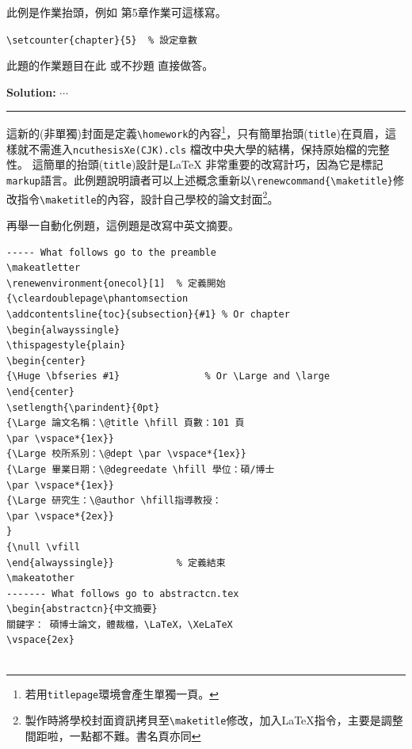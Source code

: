 \begin{appendB}
此例是作業抬頭，例如 第5章作業可這樣寫。

\verb|\setcounter{chapter}{5}  % 設定章數|
\setcounter{chapter}{5}
\begin{pr}
此題的作業題目在此 或不抄題 直接做答。

{\bf Solution:}
$\cdots$
\end{pr}

\rule{\linewidth}{0.5mm} 

這新的(非單獨)封面是定義\verb|\homework|的內容\footnote{若用{\tt titlepage}環境會產生單獨一頁。}，只有簡單抬頭({\tt title})在頁眉，這樣就不需進入{\tt ncuthesisXe(CJK).cls}
檔改中央大學的結構，保持原始檔的完整性。
這簡單的抬頭({\tt title})設計是\LaTeX{} 非常重要的改寫計巧，因為它是標記{\tt markup}語言。此例題說明讀者可以上述概念重新以\verb|\renewcommand{\maketitle}|修改指令\verb|\maketitle|的內容，設計自己學校的論文封面\footnote{製作時將學校封面資訊拷貝至{\tt \textbackslash maketitle}修改，加入\LaTeX{}指令，主要是調整間距啦，一點都不難。書名頁亦同}。\par


再舉一自動化例題，這例題是改寫中英文摘要。

\begin{Verbatim}[frame=single,firstline=1,lastline=50,rulecolor=\color{red},label=New abstract]
----- What follows go to the preamble
\makeatletter
\renewenvironment{onecol}[1]  % 定義開始
{\cleardoublepage\phantomsection
\addcontentsline{toc}{subsection}{#1} % Or chapter
\begin{alwayssingle}
\thispagestyle{plain}
\begin{center}
{\Huge \bfseries #1}               % Or \Large and \large
\end{center}
\setlength{\parindent}{0pt}
{\Large 論文名稱：\@title \hfill 頁數：101 頁
\par \vspace*{1ex}}
{\Large 校所系別：\@dept \par \vspace*{1ex}}
{\Large 畢業日期：\@degreedate \hfill 學位：碩/博士 
\par \vspace*{1ex}}
{\Large 研究生：\@author \hfill指導教授：
\par \vspace*{2ex}}
}
{\null \vfill
\end{alwayssingle}}           % 定義結束
\makeatother
------- What follows go to abstractcn.tex
\begin{abstractcn}{中文摘要}
關鍵字： 碩博士論文，體裁檔，\LaTeX，\XeLaTeX
\vspace{2ex}


\end{Verbatim}
\end{appendB}
